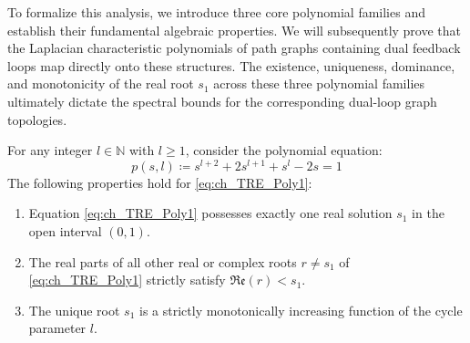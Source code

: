 To formalize this analysis, we introduce three core polynomial families and establish their fundamental algebraic properties. We will subsequently prove that the Laplacian characteristic polynomials of path graphs containing dual feedback loops map directly onto these structures. The existence, uniqueness, dominance, and monotonicity of the real root $s_1$ across these three polynomial families ultimately dictate the spectral bounds for the corresponding dual-loop graph topologies.
\begin{lemma}\label{Lemma:ch_TRE_poly1}
For any integer $l \in \mathbb{N}$ with $l \ge 1$, consider the polynomial equation:
\begin{equation} \label{eq:ch_TRE_Poly1}
	p(s, l) \coloneqq s^{l+2} + 2s^{l+1} + s^{l} - 2s = 1
\end{equation}
The following properties hold for \eqref{eq:ch_TRE_Poly1}:
\begin{enumerate}
	\item Equation \eqref{eq:ch_TRE_Poly1} possesses exactly one real solution $s_1$ in the open interval $(0,1)$.
	\item The real parts of all other real or complex roots $r \neq s_1$ of \eqref{eq:ch_TRE_Poly1} strictly satisfy $\mathfrak{Re}(r) < s_1$.
	\item The unique root $s_1$ is a strictly monotonically increasing function of the cycle parameter $l$.
\end{enumerate}
\end{lemma}
